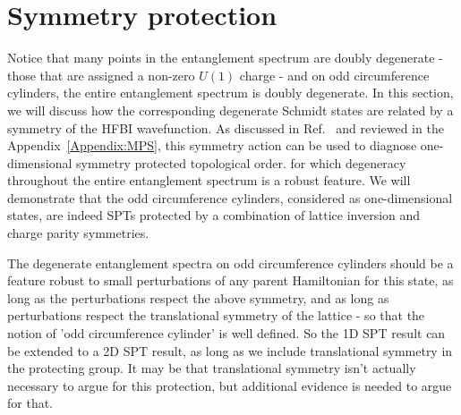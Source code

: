 \section{Symmetry protection}
\label{sec:symmetry}

Notice that many points in the entanglement spectrum are doubly degenerate - those that are
assigned a non-zero $U(1)$ charge - and on odd circumference cylinders, the
entire entanglement spectrum is doubly degenerate. In this section, we will discuss how
the corresponding degenerate Schmidt states are related by a symmetry of the HFBI wavefunction. 
As discussed in Ref.~ and reviewed in the Appendix~\ref{Appendix:MPS},
this symmetry action can be used to diagnose one-dimensional symmetry protected topological order.
for which degeneracy throughout the entire entanglement spectrum is a robust feature.
We will demonstrate that the odd circumference cylinders, considered as one-dimensional states, 
are indeed SPTs protected by a combination of lattice inversion and charge parity symmetries.


The degenerate entanglement spectra on odd circumference cylinders should be a feature 
robust to small perturbations of any parent Hamiltonian for this state, as long as the 
perturbations respect the above symmetry, and as long as perturbations respect the translational
symmetry of the lattice - so that the notion of 'odd circumference cylinder' is well defined.
So the 1D SPT result can be extended to a 2D SPT result, as long as we include translational
symmetry in the protecting group. It may be that translational symmetry isn't actually necessary
to argue for this protection, but additional evidence is needed to argue for that. 











